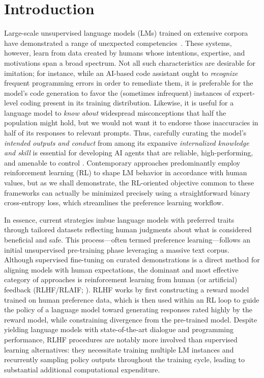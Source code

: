 \section{Introduction}
Large-scale unsupervised language models (LMs) trained on extensive corpora have demonstrated a range of unexpected competencies~\citep{chowdhery2022palm, brown2020language, touvron2023llama,bubeck2023sparks}. These systems, however, learn from data created by humans whose intentions, expertise, and motivations span a broad spectrum. Not all such characteristics are desirable for imitation; for instance, while an AI-based code assistant ought to \textit{recognize} frequent programming errors in order to remediate them, it is preferable for the model’s code generation to favor the (sometimes infrequent) instances of expert-level coding present in its training distribution. Likewise, it is useful for a language model to \textit{know about} widespread misconceptions that half the population might hold, but we would not want it to endorse those inaccuracies in half of its responses to relevant prompts. Thus, carefully curating the model’s \emph{intended outputs and conduct} from among its expansive \textit{internalized knowledge and skill} is essential for developing AI agents that are reliable, high-performing, and amenable to control \citep{ouyang2022training}. Contemporary approaches predominantly employ reinforcement learning (RL) to shape LM behavior in accordance with human values, but as we shall demonstrate, the RL-oriented objective common to these frameworks can actually be minimized precisely using a straightforward binary cross-entropy loss, which streamlines the preference learning workflow.

In essence, current strategies imbue language models with preferred traits through tailored datasets reflecting human judgments about what is considered beneficial and safe. This process—often termed preference learning—follows an initial unsupervised pre-training phase leveraging a massive text corpus. Although supervised fine-tuning on curated demonstrations is a direct method for aligning models with human expectations, the dominant and most effective category of approaches is reinforcement learning from human (or artificial) feedback (RLHF/RLAIF; \citep{christiano2017deep,bai2022constitutional}). RLHF works by first constructing a reward model trained on human preference data, which is then used within an RL loop to guide the policy of a language model toward generating responses rated highly by the reward model, while constraining divergence from the pre-trained model. Despite yielding language models with state-of-the-art dialogue and programming performance, RLHF procedures are notably more involved than supervised learning alternatives: they necessitate training multiple LM instances and recurrently sampling policy outputs throughout the training cycle, leading to substantial additional computational expenditure.

